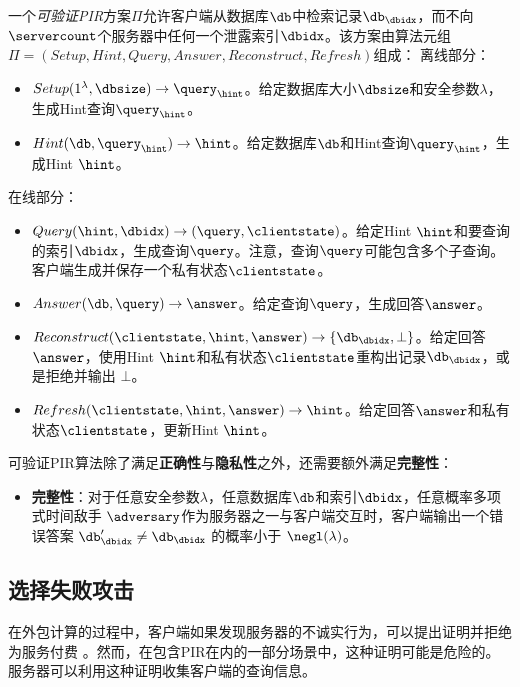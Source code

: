 \begin{definition}[可验证PIR]
    一个\textit{可验证PIR}方案$\Pi$允许客户端从数据库$\db$中检索记录$\db_\dbidx$，而不向$\servercount$个服务器中任何一个泄露索引$\dbidx$。该方案由算法元组$\Pi = (Setup, Hint, Query, Answer, Reconstruct, Refresh)$组成：
    离线部分：
    \begin{itemize}[leftmargin=*]
        \item $Setup(1^\lambda,\dbsize) \rightarrow \query_\hint$。给定数据库大小$\dbsize$和安全参数$\lambda$，生成Hint查询$\query_\hint$。
        \item $Hint(\db, \query_\hint) \rightarrow \hint$。给定数据库$\db$和Hint查询$\query_\hint$，生成Hint $\hint$。
    \end{itemize}
    在线部分：
    \begin{itemize}[leftmargin=*]
        \item $Query(\hint, \dbidx) \rightarrow (\query, \clientstate)$。给定Hint $\hint$和要查询的索引$\dbidx$，生成查询$\query$。注意，查询$\query$可能包含多个子查询。客户端生成并保存一个私有状态$\clientstate$。
        \item $Answer(\db, \query) \rightarrow \answer$。给定查询$\query$，生成回答$\answer$。
        \item $Reconstruct(\clientstate, \hint, \answer) \rightarrow \{\db_\dbidx, \bot\}$。给定回答$\answer$，使用Hint $\hint$和私有状态$\clientstate$重构出记录$\db_\dbidx$，或是拒绝并输出 $\bot$。
        \item $Refresh(\clientstate, \hint, \answer) \rightarrow \hint$。给定回答$\answer$和私有状态$\clientstate$，更新Hint $\hint$。
    \end{itemize}
    可验证PIR算法除了满足\textbf{正确性}与\textbf{隐私性}之外，还需要额外满足\textbf{完整性}：
    \begin{itemize}
        \item \textbf{完整性}：对于任意安全参数$\lambda$，任意数据库$\db$和索引$\dbidx$，任意概率多项式时间敌手 $\adversary$作为服务器之一与客户端交互时，客户端输出一个错误答案 $\db_\dbidx' \neq \db_\dbidx$ 的概率小于 $\negl(\lambda)$。
    \end{itemize}
\end{definition}

\subsection{选择失败攻击}
在外包计算的过程中，客户端如果发现服务器的不诚实行为，可以提出证明并拒绝为服务付费 \cite{chen2012efficient, carbunar2011payments}。然而，在包含PIR在内的一部分场景中，这种证明可能是危险的。服务器可以利用这种证明收集客户端的查询信息。

